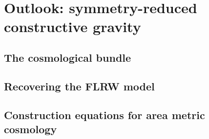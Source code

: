 \chapter{Outlook: symmetry-reduced constructive gravity}

\section{The cosmological bundle}

\section{Recovering the FLRW model}

\section{Construction equations for area metric cosmology}

